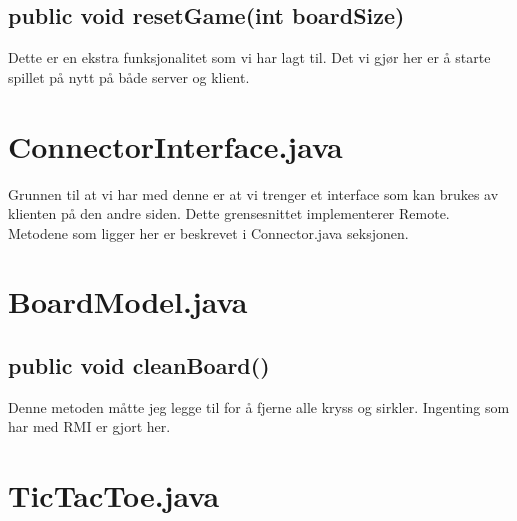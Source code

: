 \documentclass[11pt, a4paper]{article}	%
\begin{document}
\subsection*{public void resetGame(int boardSize) }
Dette er en ekstra funksjonalitet som vi har lagt til. Det vi gjør her er å starte spillet på nytt på både server og klient.

\section{ConnectorInterface.java}
Grunnen til at vi har med denne er at vi trenger et interface som kan brukes av klienten på den andre siden. Dette grensesnittet implementerer Remote. Metodene som ligger her er beskrevet i Connector.java seksjonen.

\section{BoardModel.java}
\subsection*{public void cleanBoard()}
Denne metoden måtte jeg legge til for å fjerne alle kryss og sirkler. Ingenting som har med RMI er gjort her.

\section{TicTacToe.java}
\end{document}
